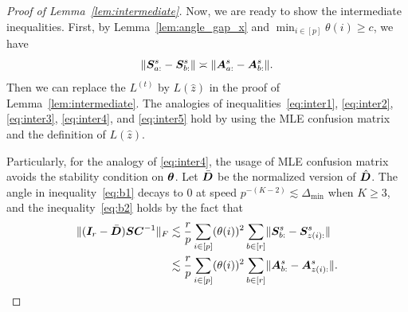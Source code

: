 \documentclass[journal]{IEEEtran}
\theoremstyle{definition}
\theoremstyle{definition}
\begin{document}
\begin{proof}[Proof of Lemma~\ref{lem:intermediate}]
{Now, we are ready to show the intermediate inequalities. First, by Lemma~\ref{lem:angle_gap_x} and $\min_{ i \in [p]} \theta(i) \geq c$, we have 
\begin{equation}
    \lVert\bm S_{a:}^s - \bm S_{b:}^s\rVert \asymp \lVert\bm A_{a:}^s - \bm A_{b:}^s\rVert.
\end{equation}
Then we can replace the $L^{(t)}$ by $L(\hat z)$ in the proof of Lemma~\ref{lem:intermediate}. The analogies of inequalities~\eqref{eq:inter1}, \eqref{eq:inter2}, \eqref{eq:inter3},  \eqref{eq:inter4}, and \eqref{eq:inter5}  hold by using the MLE confusion matrix and the definition of $L(\hat z)$. 

Particularly, for the analogy of \eqref{eq:inter4}, the usage of MLE confusion matrix avoids the stability condition on $\boldsymbol{\theta}$. Let $\bar {\bm{D}}$ be the normalized version of $\hat {\bm{D}}$. The angle in inequality~\eqref{eq:b1} decays to 0 at speed $p^{-(K-2)} \lesssim \Delta_{\min}$ when $K \geq 3$, and the inequality~\eqref{eq:b2} holds by the fact that 
\begin{align}
    \lVert(\bm I_r - \bar {\bm{D}}) \bm S \bm C^{-1}\rVert_F 
    &\lesssim \frac{r}{p} \sum_{i \in [p]} (\theta(i))^2 \sum_{b \in [r]} \lVert\bm S_{b:}^s - \bm S_{z(i):}^s\rVert \\
    &\lesssim \frac{r}{p} \sum_{i \in [p]} (\theta(i))^2 \sum_{b \in [r]} \lVert\bm A_{b:}^s - \bm A_{z(i):}^s\rVert.
\end{align} 
  }     
       
    \end{proof}

    
   
\end{document}
